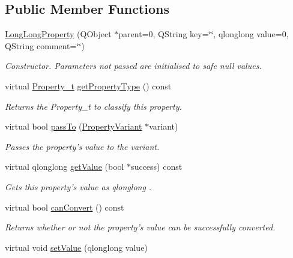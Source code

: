 \subsection*{Public Member Functions}
\begin{DoxyCompactItemize}
\item 
\hyperlink{class_long_long_property_af3527fb08c50e565e669966774ad1254}{Long\-Long\-Property} (Q\-Object $\ast$parent=0, Q\-String key=\char`\"{}\char`\"{}, qlonglong value=0, Q\-String comment=\char`\"{}\char`\"{})
\begin{DoxyCompactList}\small\item\em Constructor. Parameters not passed are initialised to safe null values. \end{DoxyCompactList}\item 
virtual \hyperlink{group___property_classes_ga38f1ccddda12c7cb50b868c9f789ee37}{Property\-\_\-t} \hyperlink{class_long_long_property_aef541867fa0047705e5ceb968da5073d}{get\-Property\-Type} () const 
\begin{DoxyCompactList}\small\item\em Returns the Property\-\_\-t to classify this property. \end{DoxyCompactList}\item 
virtual bool \hyperlink{class_long_long_property_a4954cdf7702dcefc7e072934b2b4e80c}{pass\-To} (\hyperlink{class_property_variant}{Property\-Variant} $\ast$variant)
\begin{DoxyCompactList}\small\item\em Passes the property's value to the variant. \end{DoxyCompactList}\item 
virtual qlonglong \hyperlink{class_long_long_property_a55da84c1e1c5db5431a3b5ddae6a72eb}{get\-Value} (bool $\ast$success) const 
\begin{DoxyCompactList}\small\item\em Gets this property's value as qlonglong . \end{DoxyCompactList}\item 
virtual bool \hyperlink{class_long_long_property_a2690f56d6b804d37eec1457250da4acb}{can\-Convert} () const 
\begin{DoxyCompactList}\small\item\em Returns whether or not the property's value can be successfully converted. \end{DoxyCompactList}\item 
virtual void \hyperlink{class_long_long_property_abff074961b681f08072260664b0221f6}{set\-Value} (qlonglong value)

\end{DoxyCompactItemize}
